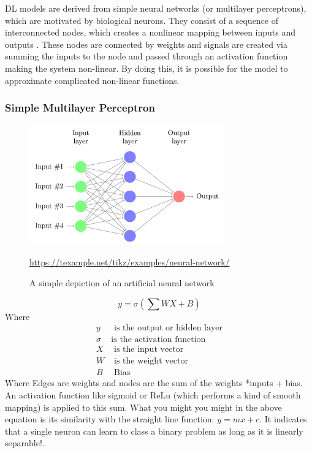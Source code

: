  DL models are derived from simple neural networks (or multilayer perceptrons), which are motivated by biological neurons. They consist of a sequence of interconnected nodes, which creates a nonlinear mapping between inputs and outputs \cite{gardner1998artificial}. These nodes are connected by weights and signals are created via summing the inputs to the node and passed through an activation function making the system non-linear. By doing this, it is possible for the model to approximate complicated non-linear functions.
 
 \subsubsection*{Simple Multilayer Perceptron}
 
 \begin{figure}[h]
 	\includegraphics[width=0.75\textwidth]{../Figures/neural-network.png}
 	\caption[An ANN]{A simple depiction of an artificial neural network} \url{https://texample.net/tikz/examples/neural-network/}
 	\label{fig:appendix-mlp}
 \end{figure}
 
 \begin{equation*}
 	y =  \sigma\left(\sum WX + B\right)
 \end{equation*}
 Where
 \begin{align*}
 	y &  \text{ is the output or hidden layer} \\
 	\sigma &  \text{is the activation function} \\
 	X &  \text{ is the input vector} \\
 	W &  \text{ is the weight vector} \\
 	B &  \text{ Bias}
 \end{align*}
 Where Edges are weights and nodes are the sum of the weights *inputs + bias. An activation function like sigmoid or ReLu (which performs a kind of smooth mapping) is applied to this sum. What you might you might in the above equation is its similarity with the straight line function: $y = mx + c$. It indicates that a single neuron can learn to class a binary problem as long as it is linearly separable!. \\
 

